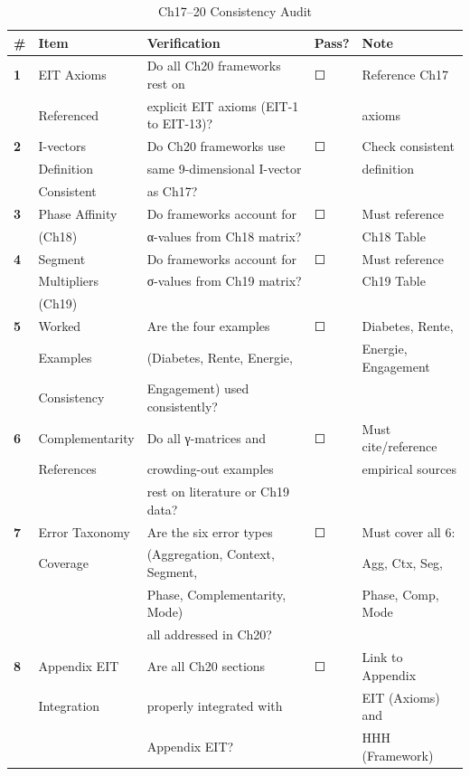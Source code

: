 \begin{table}[htbp]
\centering
\caption{Ch17--20 Consistency Audit}
\label{tab:20-consistency-checklist}
\renewcommand{\arraystretch}{1.3}
\footnotesize
\begin{tabular}{@{}llp{6cm}ll@{}}
\toprule
\textbf{\#} & \textbf{Item} & \textbf{Verification} & \textbf{Pass?} & \textbf{Note} \\
\midrule
\textbf{1} & EIT Axioms & Do all Ch20 frameworks rest on & ☐ & Reference Ch17 \\
& Referenced & explicit EIT axioms (EIT-1 to EIT-13)? & & axioms \\
\midrule
\textbf{2} & I-vectors & Do Ch20 frameworks use & ☐ & Check consistent \\
& Definition & same 9-dimensional I-vector & & definition \\
& Consistent & as Ch17? & & \\
\midrule
\textbf{3} & Phase Affinity & Do frameworks account for & ☐ & Must reference \\
& (Ch18) & α-values from Ch18 matrix? & & Ch18 Table \\
\midrule
\textbf{4} & Segment & Do frameworks account for & ☐ & Must reference \\
& Multipliers & σ-values from Ch19 matrix? & & Ch19 Table \\
& (Ch19) & & & \\
\midrule
\textbf{5} & Worked & Are the four examples & ☐ & Diabetes, Rente, \\
& Examples & (Diabetes, Rente, Energie, & & Energie, Engagement \\
& Consistency & Engagement) used consistently? & & \\
\midrule
\textbf{6} & Complementarity & Do all γ-matrices and & ☐ & Must cite/reference \\
& References & crowding-out examples & & empirical sources \\
& & rest on literature or Ch19 data? & & \\
\midrule
\textbf{7} & Error Taxonomy & Are the six error types & ☐ & Must cover all 6: \\
& Coverage & (Aggregation, Context, Segment, & & Agg, Ctx, Seg, \\
& & Phase, Complementarity, Mode) & & Phase, Comp, Mode \\
& & all addressed in Ch20? & & \\
\midrule
\textbf{8} & Appendix EIT & Are all Ch20 sections & ☐ & Link to Appendix \\
& Integration & properly integrated with & & EIT (Axioms) and \\
& & Appendix EIT? & & HHH (Framework) \\
\bottomrule
\end{tabular}
\end{table}

